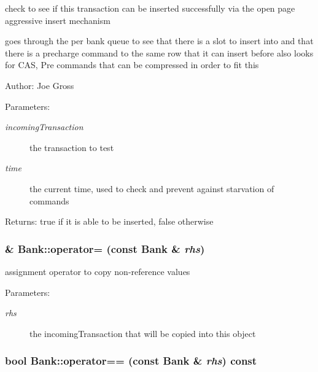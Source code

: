 check to see if this transaction can be inserted successfully via the open page aggressive insert mechanism 

goes through the per bank queue to see that there is a slot to insert into and that there is a precharge command to the same row that it can insert before also looks for CAS, Pre commands that can be compressed in order to fit this \begin{Desc}
\item[Author:]Joe Gross \end{Desc}
\begin{Desc}
\item[Parameters:]
\begin{description}
\item[{\em incomingTransaction}]the transaction to test \item[{\em time}]the current time, used to check and prevent against starvation of commands \end{description}
\end{Desc}
\begin{Desc}
\item[Returns:]true if it is able to be inserted, false otherwise \end{Desc}
\subsubsection[{operator=}]{ \& Bank::operator= (const {\bf Bank} \& {\em rhs})}\label{class_d_r_a_msim_i_i_1_1_bank_a920eb2489a9724e3d2093aa7765c330}


assignment operator to copy non-reference values 

\begin{Desc}
\item[Parameters:]
\begin{description}
\item[{\em rhs}]the incomingTransaction that will be copied into this object \end{description}
\end{Desc}
\subsubsection[{operator==}]{\setlength{\rightskip}{0pt plus 5cm}bool Bank::operator== (const {\bf Bank} \& {\em rhs}) const}\label{class_d_r_a_msim_i_i_1_1_bank_d8aad44df9b266d6a91daa622c5d61f1}


